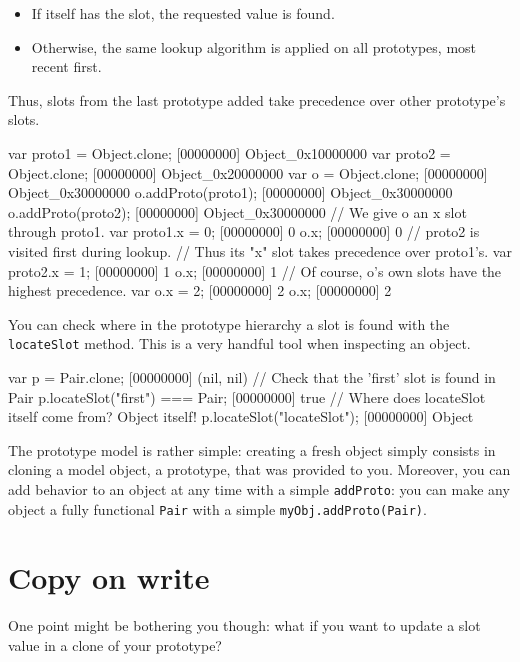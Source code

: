 \begin{itemize}
\item If  itself has the slot, the requested value is found.
\item Otherwise, the same lookup algorithm is applied on all
  prototypes, most recent first.
\end{itemize}

Thus, slots from the last prototype added take precedence over other
prototype's slots.

\begin{urbiscript}
var proto1 = Object.clone;
[00000000] Object_0x10000000
var proto2 = Object.clone;
[00000000] Object_0x20000000
var o = Object.clone;
[00000000] Object_0x30000000
o.addProto(proto1);
[00000000] Object_0x30000000
o.addProto(proto2);
[00000000] Object_0x30000000
// We give o an x slot through proto1.
var proto1.x = 0;
[00000000] 0
o.x;
[00000000] 0
// proto2 is visited first during lookup.
// Thus its "x" slot takes precedence over proto1's.
var proto2.x = 1;
[00000000] 1
o.x;
[00000000] 1
// Of course, o's own slots have the highest precedence.
var o.x = 2;
[00000000] 2
o.x;
[00000000] 2
\end{urbiscript}

You can check where in the prototype hierarchy a slot is found with
the \lstinline{locateSlot} method. This is a very
handful tool when inspecting an object.

\begin{urbiscript}
var p = Pair.clone;
[00000000] (nil, nil)
// Check that the 'first' slot is found in Pair
p.locateSlot("first") === Pair;
[00000000] true
// Where does locateSlot itself come from? Object itself!
p.locateSlot("locateSlot");
[00000000] Object
\end{urbiscript}

The prototype model is rather simple: creating a fresh object simply
consists in cloning a model object, a prototype, that was provided to
you.  Moreover, you can add behavior to an object at any time with a
simple \lstinline{addProto}: you can make any object a fully
functional \lstinline|Pair| with a simple
\lstinline|myObj.addProto(Pair)|.

\section{Copy on write}

One point might be bothering you though: what if you want to update a
slot value in a clone of your prototype?

